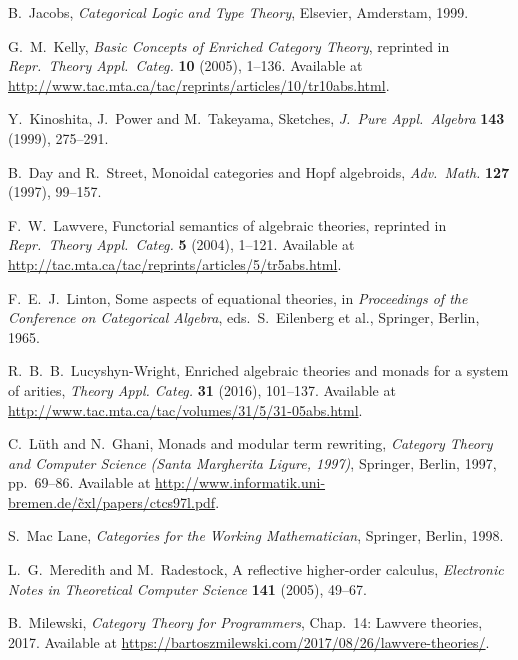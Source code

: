 \documentclass{amsart}
\theoremstyle{definition}
\begin{document}
\begin{thebibliography}{100}
 B.\ Jacobs, \textsl{Categorical Logic and Type Theory}, Elsevier, Amderstam, 1999.
	
 G.\ M.\ Kelly, \textsl{Basic Concepts of Enriched Category Theory}, reprinted in
\textsl{Repr.\ Theory Appl.\ Categ.} \textbf{10} (2005), 1--136.  Available at \href{http://www.tac.mta.ca/tac/reprints/articles/10/tr10abs.html}{http://www.tac.mta.ca/tac/reprints/articles/10/tr10abs.html}.

 Y.\ Kinoshita, J.\ Power and M.\ Takeyama, Sketches,
\textsl{J.\ Pure Appl.\ Algebra} \textbf{143} (1999), 275--291.

 B.\ Day and R.\ Street, Monoidal categories and Hopf algebroids,
\textsl{Adv.\ Math.} \textbf{127} (1997), 99--157.

 F.\ W.\ Lawvere, Functorial semantics of algebraic theories, reprinted in
\textsl{Repr.\ Theory Appl.\ Categ.} \textbf{5} (2004), 1--121.  Available at \href{http://tac.mta.ca/tac/reprints/articles/5/tr5abs.html}{http://tac.mta.ca/tac/reprints/articles/5/tr5abs.html}.

 F.\ E.\ J.\ Linton, Some aspects of equational theories, in 
\textsl{Proceedings of the Conference on Categorical Algebra}, eds.\ S.\ Eilenberg et al.,
Springer, Berlin, 1965.

 R.\ B.\ B.\ Lucyshyn-Wright, Enriched algebraic theories and monads for a system of arities, \textsl{Theory Appl. Categ.} \textbf{31} (2016), 101--137.  Available at \href{http://www.tac.mta.ca/tac/volumes/31/5/31-05abs.html}{http://www.tac.mta.ca/tac/volumes/31/5/31-05abs.html}.
	
 C.\ L\"{u}th and N.\ Ghani, Monads and modular term rewriting,
\textsl{Category Theory and Computer Science ({S}anta {M}argherita Ligure, 1997)}, Springer, Berlin, 1997, pp.\ 69--86.  Available at \href{http://www.informatik.uni-bremen.de/~cxl/papers/ctcs97l.pdf}{http://www.informatik.uni-bremen.de/\~cxl/papers/ctcs97l.pdf}.

 S.\ Mac Lane, \textsl{Categories for the Working Mathematician}, Springer, Berlin, 1998.  

 L.\ G.\ Meredith and M.\ Radestock, A reflective higher-order calculus,
\textsl{Electronic Notes in Theoretical Computer Science} \textbf{141} (2005), 49--67.

 B.\ Milewski, \textsl{Category Theory for Programmers}, Chap.\ 14: Lawvere theories, 2017.   Available at \href{https://bartoszmilewskiski.com/2017/08/26/lawvere-theories/}{https://bartoszmilewski.com/2017/08/26/lawvere-theories/}.


\end{thebibliography}
\end{document}
